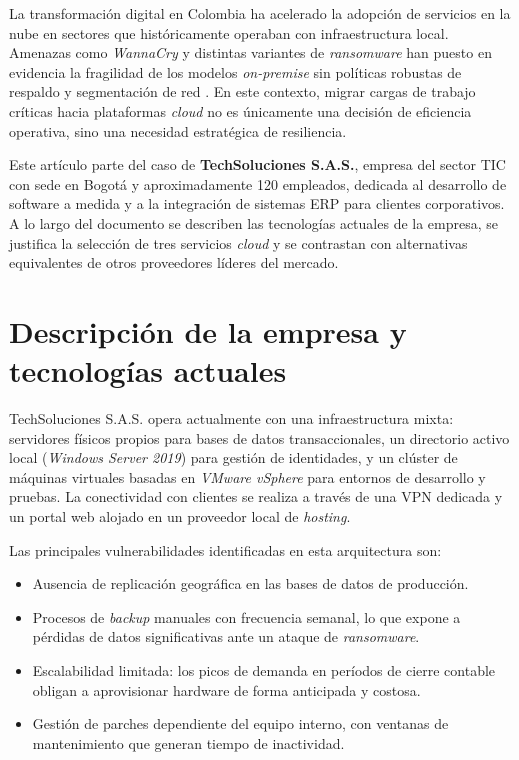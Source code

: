 \documentclass[12pt, a4paper]{article}
\begin{document}
La transformación digital en Colombia ha acelerado la adopción de servicios en la nube en sectores que históricamente operaban con infraestructura local. Amenazas como \textit{WannaCry} y distintas variantes de \textit{ransomware} han puesto en evidencia la fragilidad de los modelos \textit{on-premise} sin políticas robustas de respaldo y segmentación de red \autocite{NIST2011}. En este contexto, migrar cargas de trabajo críticas hacia plataformas \textit{cloud} no es únicamente una decisión de eficiencia operativa, sino una necesidad estratégica de resiliencia.

Este artículo parte del caso de \textbf{TechSoluciones S.A.S.}, empresa del sector TIC con sede en Bogotá y aproximadamente 120 empleados, dedicada al desarrollo de software a medida y a la integración de sistemas ERP para clientes corporativos. A lo largo del documento se describen las tecnologías actuales de la empresa, se justifica la selección de tres servicios \textit{cloud} y se contrastan con alternativas equivalentes de otros proveedores líderes del mercado.

\section{Descripción de la empresa y tecnologías actuales}

TechSoluciones S.A.S. opera actualmente con una infraestructura mixta: servidores físicos propios para bases de datos transaccionales, un directorio activo local (\textit{Windows Server 2019}) para gestión de identidades, y un clúster de máquinas virtuales basadas en \textit{VMware vSphere} para entornos de desarrollo y pruebas. La conectividad con clientes se realiza a través de una VPN dedicada y un portal web alojado en un proveedor local de \textit{hosting}.

Las principales vulnerabilidades identificadas en esta arquitectura son:

\begin{itemize}
  \item Ausencia de replicación geográfica en las bases de datos de producción.
  \item Procesos de \textit{backup} manuales con frecuencia semanal, lo que expone a pérdidas de datos significativas ante un ataque de \textit{ransomware}.
  \item Escalabilidad limitada: los picos de demanda en períodos de cierre contable obligan a aprovisionar hardware de forma anticipada y costosa.
  \item Gestión de parches dependiente del equipo interno, con ventanas de mantenimiento que generan tiempo de inactividad.
\end{itemize}
\end{document}
